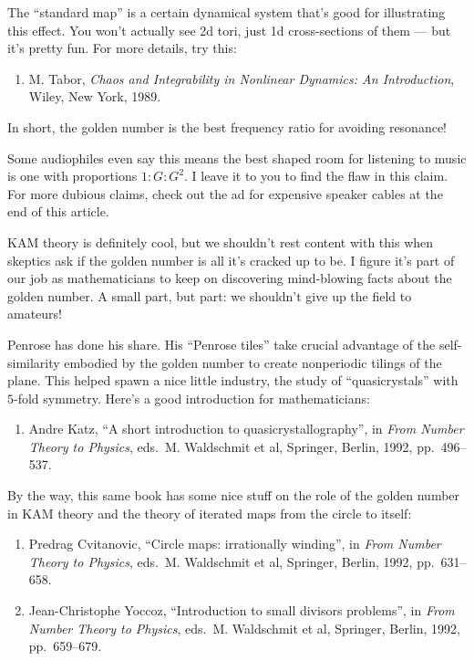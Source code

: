 \documentclass{article}
\def\tightlist{}
\begin{document}
The ``standard map'' is a certain dynamical system that's good for
illustrating this effect. You won't actually see 2d tori, just 1d
cross-sections of them --- but it's pretty fun. For more details, try
this:

\begin{enumerate}
\def\labelenumi{\arabic{enumi})}
\setcounter{enumi}{7}
\tightlist
\item
  M. Tabor, \emph{Chaos and Integrability in Nonlinear Dynamics: An
  Introduction}, Wiley, New York, 1989.
\end{enumerate}

In short, the golden number is the best frequency ratio for avoiding
resonance!

Some audiophiles even say this means the best shaped room for listening
to music is one with proportions \(1:G:G^2\). I leave it to you to find
the flaw in this claim. For more dubious claims, check out the ad for
expensive speaker cables at the end of this article.

KAM theory is definitely cool, but we shouldn't rest content with this
when skeptics ask if the golden number is all it's cracked up to be. I
figure it's part of our job as mathematicians to keep on discovering
mind-blowing facts about the golden number. A small part, but part: we
shouldn't give up the field to amateurs!

Penrose has done his share. His ``Penrose tiles'' take crucial advantage
of the self-similarity embodied by the golden number to create
nonperiodic tilings of the plane. This helped spawn a nice little
industry, the study of ``quasicrystals'' with \(5\)-fold symmetry.
Here's a good introduction for mathematicians:

\begin{enumerate}
\def\labelenumi{\arabic{enumi})}
\setcounter{enumi}{8}
\tightlist
\item
  Andre Katz, ``A short introduction to quasicrystallography'', in
  \emph{From Number Theory to Physics}, eds.~M. Waldschmit et al,
  Springer, Berlin, 1992, pp.~496--537.
\end{enumerate}

By the way, this same book has some nice stuff on the role of the golden
number in KAM theory and the theory of iterated maps from the circle to
itself:

\begin{enumerate}
\def\labelenumi{\arabic{enumi})}
\setcounter{enumi}{9}
\item
  Predrag Cvitanovic, ``Circle maps: irrationally winding'', in
  \emph{From Number Theory to Physics}, eds.~M. Waldschmit et al,
  Springer, Berlin, 1992, pp.~631--658.
\item
  Jean-Christophe Yoccoz, ``Introduction to small divisors problems'',
  in \emph{From Number Theory to Physics}, eds.~M. Waldschmit et al,
  Springer, Berlin, 1992, pp.~659--679.
\end{enumerate}
\end{document}
